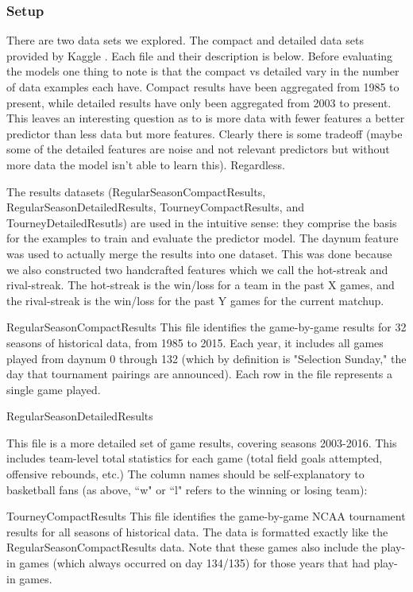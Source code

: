 \documentclass{article} %
\begin{document}
\subsubsection{Setup}
\label{sec:data-winner-setup}

There are two data sets we explored.  The compact and detailed data sets provided by Kaggle \citep{kagglecompetition}.  Each file and their description is below.  Before evaluating the models one thing to note is that the compact vs detailed vary in the number of data examples each have.  Compact results have been aggregated from 1985 to present, while detailed results have only been aggregated from 2003 to present.  This leaves an interesting question as to is more data with fewer features a better predictor than less data but more features.  Clearly there is some tradeoff (maybe some of the detailed features are noise and not relevant predictors but without more data the model isn't able to learn this).  Regardless.

The results datasets (RegularSeasonCompactResults, RegularSeasonDetailedResults, TourneyCompactResults, and TourneyDetailedResutls) are used in the intuitive sense: they comprise the basis for the examples to train and evaluate the predictor model.  The daynum feature was used to actually merge the results into one dataset.  This was done because we also constructed two handcrafted features which we call the hot-streak and rival-streak.  The hot-streak is the win/loss for a team in the past X games, and the rival-streak is the win/loss for the past Y games for the current matchup.

RegularSeasonCompactResults
This file identifies the game-by-game results for 32 seasons of historical data, from 1985 to 2015. Each year, it includes all games played from daynum 0 through 132 (which by definition is "Selection Sunday," the day that tournament pairings are announced). Each row in the file represents a single game played.


RegularSeasonDetailedResults

This file is a more detailed set of game results, covering seasons 2003-2016. This includes team-level total statistics for each game (total field goals attempted, offensive rebounds, etc.) The column names should be self-explanatory to basketball fans (as above, ``w" or ``l" refers to the winning or losing team):


TourneyCompactResults
This file identifies the game-by-game NCAA tournament results for all seasons of historical data. The data is formatted exactly like the RegularSeasonCompactResults data. Note that these games also include the play-in games (which always occurred on day 134/135) for those years that had play-in games.
\end{document}
